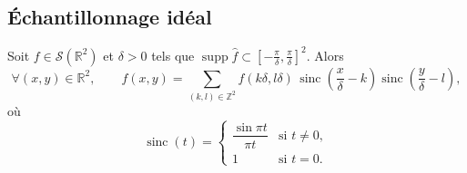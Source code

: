 \subsection{Échantillonnage idéal}
 
\begin{theorem}
  Soit $f\in\mathcal{S}(\mathbb{R}^2)$ et $\delta>0$ tels que $\operatorname{supp}\hat f\subset\left[-\frac\pi\delta,\frac\pi\delta\right]^{2}$. Alors
  \[
    \forall (x,y)\in\mathbb{R}^2,\qquad
    f(x,y)=\sum_{(k,l)\in\mathbb{Z}^2}f(k\delta,l\delta)\,
    \operatorname{sinc}\!\left(\frac x\delta-k\right)\operatorname{sinc}\!\left(\frac y\delta-l\right),
  \]
  où
  \[
    \operatorname{sinc}(t)=\begin{cases}\dfrac{\sin\pi t}{\pi t} & \text{si } t\neq0,\\[2mm] 1 & \text{si } t=0.\end{cases}
  \]
\end{theorem}
 
\begin{figure}[!h]\centering
  
\end{figure}
 
